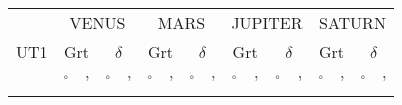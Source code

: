 \documentclass[a4paper]{article}
\begin{document}
\begin{center}
    {\small
    \begin{tabular}{ c | c c | c c | c c | c c | c c | c c | c c | c c}

    \rowcolor{gray} & \multicolumn{4}{c|}{VENUS} & \multicolumn{4}{c|}{MARS} & \multicolumn{4}{c|}{JUPITER} & \multicolumn{4}{c}{SATURN} \\ 
    \rowcolor{gray} UT1 & \multicolumn{2}{c}{Grt} & \multicolumn{2}{c|}{$\delta$} & \multicolumn{2}{c}{Grt} & \multicolumn{2}{c|}{$\delta$} & \multicolumn{2}{c}{Grt} & \multicolumn{2}{c|}{$\delta$} & \multicolumn{2}{c}{Grt} & \multicolumn{2}{c}{$\delta$} \\
    \rowcolor{gray} & $^\circ$ & ' & $^\circ$ & ' & $^\circ$ & ' & $^\circ$ & ' & $^\circ$ & ' & $^\circ$ & ' & $^\circ$ & ' & $^\circ$ & ' \\


\end{tabular}}
\end{center}
\end{document}
